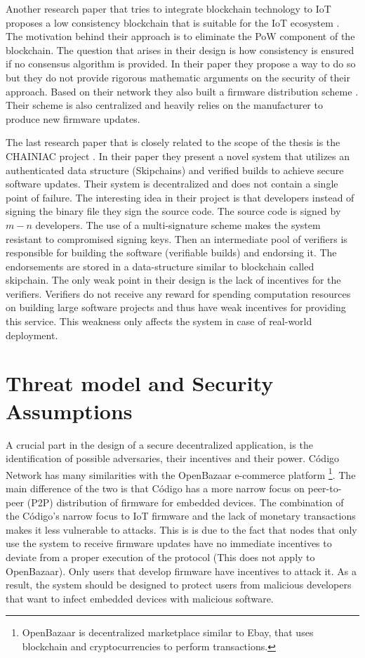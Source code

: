 {{Another research paper that tries to integrate blockchain technology to IoT proposes a low consistency blockchain that is suitable for the IoT ecosystem \cite{Dorri2017TowardsIoT}. The motivation behind their approach is to eliminate the PoW component of the blockchain. The question that arises in their design is how consistency is ensured if no consensus algorithm is provided. In their paper they propose a way to do so but they do not provide rigorous mathematic arguments on the security of their approach. Based on their network they also built a firmware distribution scheme 
\cite{Steger2017SecureConcept}. Their scheme is also centralized and heavily relies on the manufacturer to produce new firmware updates.

The last research paper that is closely related to the scope of the thesis is the CHAINIAC project \cite{nikitin2017chainiac}. In their paper they present a novel system that utilizes an authenticated data structure (Skipchains) and verified builds to achieve secure software updates. Their system is decentralized and does not contain a single point of failure. The interesting idea in their project is that developers instead of signing the binary file they sign the source code. The source code is signed by $m-n$ developers. The use of a multi-signature scheme makes the system resistant to compromised signing keys. Then an intermediate pool of verifiers is responsible for building the software (verifiable builds) and endorsing it. The endorsements are stored in a data-structure similar to blockchain called skipchain. The only weak point in their design is the lack of incentives for the verifiers. Verifiers do not receive any reward for spending computation resources on building large software projects and thus have weak incentives for providing this service. This weakness only affects the system in case of real-world deployment.
}

\section{Threat model and Security Assumptions}{

A crucial part in the design of a secure decentralized application, is the identification of possible adversaries, their incentives and their power. Código Network has many similarities with the OpenBazaar e-commerce platform \footnote{OpenBazaar is decentralized marketplace similar to Ebay, that uses blockchain and cryptocurrencies to perform transactions.}. The main difference of the two is that Código has a more narrow focus on peer-to-peer (P2P) distribution of firmware for embedded devices. The combination of the Código's narrow focus to IoT firmware and the lack of monetary transactions makes it less vulnerable to attacks. This is is due to the fact that nodes that only use the system to receive firmware updates have no immediate incentives to deviate from a proper execution of the protocol (This does not apply to OpenBazaar). Only users that develop firmware have incentives to attack it. As a result, the system should be designed to protect users from malicious developers that want to infect embedded devices with malicious software.

}}
